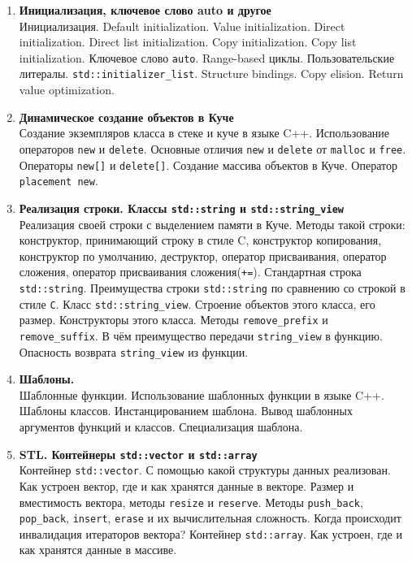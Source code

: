 \documentclass{article}
\begin{document}
\begin{enumerate}
\item \textbf{Инициализация, ключевое слово auto и другое}\\
Инициализация. Default initialization. Value initialization. Direct initialization. Direct list initialization. Copy initialization. Copy list initialization. Ключевое слово \texttt{auto}. Range-based циклы. Пользовательские литералы. \texttt{std::initializer\_list}. Structure bindings. Copy elision. Return value optimization.

\item  \textbf{Динамическое создание объектов в Куче}\\
Создание экземпляров класса в стеке и куче в языке C++. Использование операторов \texttt{new} и \texttt{delete}. Основные отличия \texttt{new} и \texttt{delete} от \texttt{malloc} и \texttt{free}. Операторы \texttt{new[]} и \texttt{delete[]}. Создание массива объектов в Куче. Оператор \texttt{placement new}.

\item \textbf{Реализация строки. Классы \texttt{std::string} и \texttt{std::string\_view}}\\
Реализация своей строки с выделением памяти в Куче. Методы такой строки: конструктор, принимающий строку в стиле C, конструктор копирования, конструктор по умолчанию, деструктор, оператор присваивания, оператор сложения, оператор присваивания сложения(\texttt{+=}).  Стандартная строка \texttt{std::string}. Преимущества строки \texttt{std::string} по сравнению со строкой в стиле \texttt{C}. Класс \texttt{std::string\_view}. Строение объектов этого класса, его размер. Конструкторы этого класса. Методы \texttt{remove\_prefix} и \texttt{remove\_suffix}. В чём преимущество передачи \texttt{string\_view} в функцию. Опасность возврата \texttt{string\_view} из функции.

\item \textbf{Шаблоны.}\\
Шаблонные функции. Использование шаблонных функции в языке C++. Шаблоны классов. Инстанцированием шаблона. Вывод шаблонных аргументов функций и классов. Специализация шаблона.

\item \textbf{STL. Контейнеры \texttt{std::vector} и \texttt{std::array}}\\
Контейнер \texttt{std::vector}. С помощью какой структуры данных реализован. Как устроен вектор, где и как хранятся данные в векторе. Размер и вместимость вектора, методы \texttt{resize} и \texttt{reserve}. Методы \texttt{push\_back}, \texttt{pop\_back}, \texttt{insert}, \texttt{erase} и их вычислительная сложность. Когда происходит инвалидация итераторов вектора? Контейнер \texttt{std::array}. Как устроен, где и как хранятся данные в массиве.


\end{enumerate}
\end{document}

